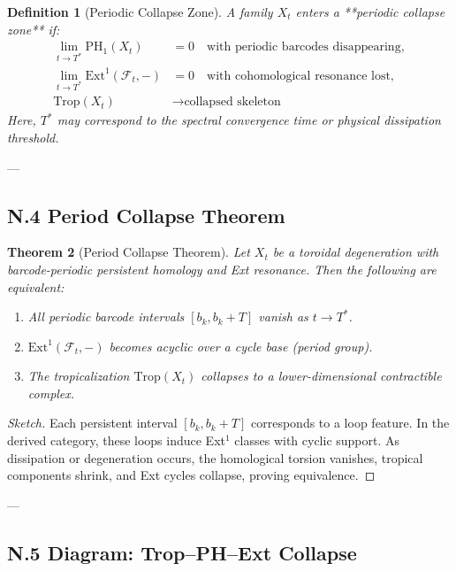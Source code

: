 \documentclass[11pt]{article}
\newtheorem{theorem}{Theorem}[section]
\newtheorem{definition}[theorem]{Definition}
\begin{document}
\begin{definition}[Periodic Collapse Zone]
A family $X_t$ enters a **periodic collapse zone** if:
\begin{align*}
\lim_{t \to T^*} \mathrm{PH}_1(X_t) &= 0 \quad \text{with periodic barcodes disappearing}, \\
\lim_{t \to T^*} \mathrm{Ext}^1(\mathcal{F}_t, -) &= 0 \quad \text{with cohomological resonance lost}, \\
\mathrm{Trop}(X_t) &\to \text{collapsed skeleton}
\end{align*}
Here, $T^*$ may correspond to the spectral convergence time or physical dissipation threshold.
\end{definition}

---

\subsection*{N.4 Period Collapse Theorem}

\begin{theorem}[Period Collapse Theorem]
Let $X_t$ be a toroidal degeneration with barcode-periodic persistent homology and Ext resonance. Then the following are equivalent:
\begin{enumerate}
  \item All periodic barcode intervals $[b_k, b_k+T]$ vanish as $t \to T^*$.
  \item $\mathrm{Ext}^1(\mathcal{F}_t, -)$ becomes acyclic over a cycle base (period group).
  \item The tropicalization $\mathrm{Trop}(X_t)$ collapses to a lower-dimensional contractible complex.
\end{enumerate}
\end{theorem}

\begin{proof}[Sketch]
Each persistent interval $[b_k, b_k + T]$ corresponds to a loop feature.  
In the derived category, these loops induce Ext$^1$ classes with cyclic support.  
As dissipation or degeneration occurs, the homological torsion vanishes, tropical components shrink, and Ext cycles collapse, proving equivalence.
\end{proof}

---

\subsection*{N.5 Diagram: Trop–PH–Ext Collapse}
\end{document}
